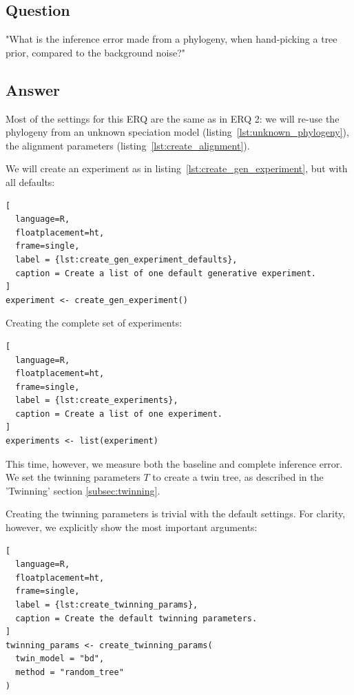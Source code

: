 \documentclass{article}
\begin{document}
\subsection{Question}

"What is the inference error made from a phylogeny, 
when hand-picking a tree prior, compared to the background noise?"

\subsection{Answer}

Most of the settings for this ERQ are
the same as in ERQ 2: we will re-use the phylogeny from an 
unknown speciation model (listing~\ref{lst:unknown_phylogeny}), 
the alignment parameters (listing~\ref{lst:create_alignment}).

We will create an experiment as in 
listing~\ref{lst:create_gen_experiment},
but with all defaults:

\begin{lstlisting}[
  language=R, 
  floatplacement=ht, 
  frame=single,
  label = {lst:create_gen_experiment_defaults},
  caption = Create a list of one default generative experiment.
]
experiment <- create_gen_experiment()
\end{lstlisting}

Creating the complete set of experiments:

\begin{lstlisting}[
  language=R, 
  floatplacement=ht, 
  frame=single,
  label = {lst:create_experiments},
  caption = Create a list of one experiment.
]
experiments <- list(experiment)
\end{lstlisting}

This time, however, we measure both the baseline and complete inference error.
We set the twinning parameters $\mathit{T}$ to create a twin tree,
as described in the 'Twinning' section \ref{subsec:twinning}.

Creating the twinning parameters is trivial with the default settings.
For clarity, however, we explicitly show the most
important arguments:

\begin{lstlisting}[
  language=R, 
  floatplacement=ht, 
  frame=single,
  label = {lst:create_twinning_params},
  caption = Create the default twinning parameters.
]
twinning_params <- create_twinning_params(
  twin_model = "bd", 
  method = "random_tree"
)
\end{lstlisting}
\end{document}
